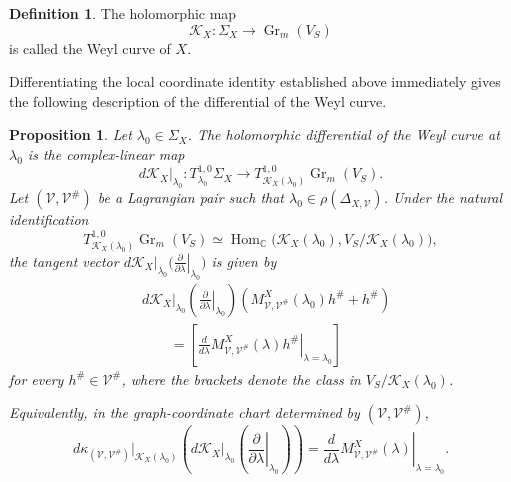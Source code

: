 \documentclass[12pt]{amsart}
\theoremstyle{plain}
\newtheorem{prop}[thm]{Proposition}
\theoremstyle{definition}
\newtheorem{defn}[thm]{Definition}
\theoremstyle{remark}
\numberwithin{equation}{section} \numberwithin{figure}{section}
\newcommand{\mb}[1]{\mathbb{#1}} %
\newcommand{\mc}[1]{\mathcal{#1}}
\begin{document}
\begin{defn}
The holomorphic map
\[
    \mc K_X:
    \Sigma_X
    \longrightarrow
    \operatorname{Gr}_m(V_S)
\]
is called the Weyl curve of \(X\).
\end{defn}

Differentiating the local coordinate identity established above
immediately gives the following description of the differential of
the Weyl curve.

\begin{prop}\label{prop:differential-weyl-curve}
Let \(\lambda_0\in\Sigma_X\). The holomorphic differential of the
Weyl curve at \(\lambda_0\) is the complex-linear map
\[
    d\mc K_X|_{\lambda_0}:
    T_{\lambda_0}^{1,0}\Sigma_X
    \longrightarrow
    T_{\mc K_X(\lambda_0)}^{1,0}
    \operatorname{Gr}_m(V_S).
\]
Let \((\mc V,\mc V^\#)\) be a Lagrangian pair such that
\(\lambda_0\in\rho(\Delta_{X,\mc V})\). Under the natural
identification
\[
    T_{\mc K_X(\lambda_0)}^{1,0}
    \operatorname{Gr}_m(V_S)
    \simeq
    \operatorname{Hom}_{\mb C}
    \bigl(
        \mc K_X(\lambda_0),
        V_S/\mc K_X(\lambda_0)
    \bigr),
\]
the tangent vector
\(
    d\mc K_X|_{\lambda_0}
    \bigl(
        \left.\frac{\partial}{\partial\lambda}\right|_{\lambda_0}
    \bigr)
\)
is given by
\[
\begin{aligned}
    &d\mc K_X|_{\lambda_0}
    \left(
        \left.\frac{\partial}{\partial\lambda}\right|_{\lambda_0}
    \right)
    \left(
        M_{\mc V,\mc V^\#}^X(\lambda_0)h^\#+h^\#
    \right)
    \\
    &\qquad
    =
    \left[
        \left.
        \frac{d}{d\lambda}
        M_{\mc V,\mc V^\#}^X(\lambda)h^\#
        \right|_{\lambda=\lambda_0}
    \right]
\end{aligned}
\]
for every \(h^\#\in\mc V^\#\), where the brackets denote the class in
\(V_S/\mc K_X(\lambda_0)\).

Equivalently, in the graph-coordinate chart determined by
\((\mc V,\mc V^\#)\),
\[
    d\kappa_{(\mc V,\mc V^\#)}|_{\mc K_X(\lambda_0)}
    \left(
        d\mc K_X|_{\lambda_0}
        \left(
            \left.\frac{\partial}{\partial\lambda}\right|_{\lambda_0}
        \right)
    \right)
    =
    \left.
    \frac{d}{d\lambda}
    M_{\mc V,\mc V^\#}^X(\lambda)
    \right|_{\lambda=\lambda_0}.
\]
\end{prop}
\end{document}
